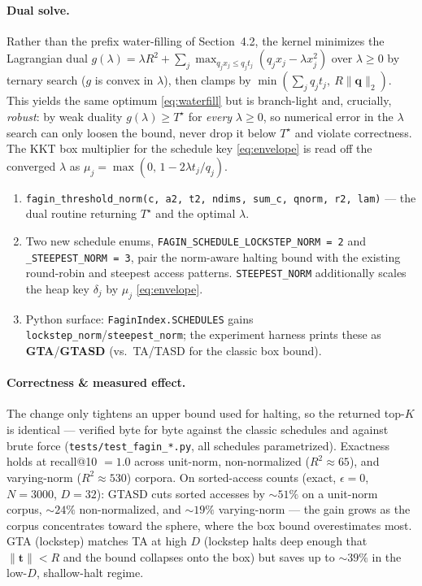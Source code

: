 \documentclass[11pt,a4paper]{article}
\newcommand{\qv}{\mathbf{q}}
\newcommand{\tv}{\mathbf{t}}
\newcommand{\norm}[1]{\lVert #1 \rVert}
\begin{document}
\paragraph{Dual solve.} Rather than the prefix water-filling of
Section~4.2, the kernel minimizes the Lagrangian dual
$g(\lambda)=\lambda R^2+\sum_j\max_{q_j x_j\le q_j t_j}(q_j x_j-\lambda x_j^2)$
over $\lambda\ge0$ by ternary search ($g$ is convex in $\lambda$), then clamps by
$\min(\sum_j q_j t_j,\ R\norm{\qv}_2)$. This yields the same optimum
\eqref{eq:waterfill} but is branch-light and, crucially, \emph{robust}: by weak
duality $g(\lambda)\ge T^\star$ for \emph{every} $\lambda\ge0$, so numerical
error in the $\lambda$ search can only loosen the bound, never drop it below
$T^\star$ and violate correctness. The KKT box multiplier for the schedule key
\eqref{eq:envelope} is read off the converged $\lambda$ as
$\mu_j=\max(0,\,1-2\lambda t_j/q_j)$.

\begin{enumerate}[nosep]
  \item \texttt{fagin\_threshold\_norm(c, a2, t2, ndims, sum\_c, qnorm, r2,
        lam)} --- the dual routine returning $T^\star$ and the optimal $\lambda$.
  \item Two new schedule enums,
        \texttt{FAGIN\_SCHEDULE\_LOCKSTEP\_NORM = 2} and
        \texttt{\_STEEPEST\_NORM = 3}, pair the norm-aware halting bound with the
        existing round-robin and steepest access patterns. \texttt{STEEPEST\_NORM}
        additionally scales the heap key $\delta_j$ by $\mu_j$
        \eqref{eq:envelope}.
  \item Python surface: \texttt{FaginIndex.SCHEDULES} gains
        \texttt{lockstep\_norm}/\texttt{steepest\_norm}; the experiment harness
        prints these as \textbf{GTA}/\textbf{GTASD} (vs.\ TA/TASD for the classic
        box bound).
\end{enumerate}

\paragraph{Correctness \& measured effect.} The change only tightens an upper
bound used for halting, so the returned top-$K$ is identical --- verified byte
for byte against the classic schedules and against brute force
(\texttt{tests/test\_fagin\_*.py}, all schedules parametrized). Exactness holds
at recall@10 $=1.0$ across unit-norm, non-normalized ($R^2\approx65$), and
varying-norm ($R^2\approx530$) corpora. On sorted-access counts (exact,
$\epsilon=0$, $N=3000$, $D=32$): GTASD cuts sorted accesses by $\sim51\%$ on a
unit-norm corpus, $\sim24\%$ non-normalized, and $\sim19\%$ varying-norm --- the
gain grows as the corpus concentrates toward the sphere, where the box bound
overestimates most. GTA (lockstep) matches TA at high $D$ (lockstep halts deep
enough that $\norm{\tv}<R$ and the bound collapses onto the box) but saves up to
$\sim39\%$ in the low-$D$, shallow-halt regime.
\end{document}
